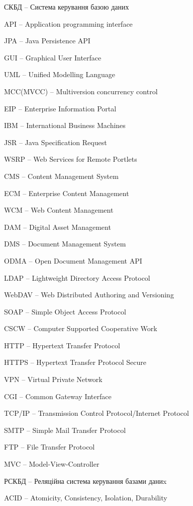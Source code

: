 \par СКБД -- Система керування базою даних
\par API -- Application programming interface
\par JPA -- Java Persistence API
\par GUI -- Graphical User Interface
\par UML -- Unified Modelling Language
\par MCC(MVCC) -- Multiversion concurrency control

\par EIP -- Enterprise Information Portal
\par IBM -- International Business Machines
\par JSR -- Java Specification Request
\par WSRP -- Web Services for Remote Portlets
\par CMS -- Content Management System 
\par ECM -- Enterprise Content Management
\par WCM -- Web Content Management 
\par DAM -- Digital Asset Management
\par DMS -- Document Management System

\par ODMA -- Open Document Management API
\par LDAP -- Lightweight Directory Access Protocol
\par WebDAV -- Web Distributed Authoring and Versioning
\par SOAP -- Simple Object Access Protocol
\par CSCW -- Computer Supported Cooperative Work

\par HTTP -- Hypertext Transfer Protocol
\par HTTPS -- Hypertext Transfer Protocol Secure
\par VPN -- Virtual Private Network
\par CGI -- Common Gateway Interface
\par TCP/IP -- Transmission Control Protocol/Internet Protocol
\par SMTP -- Simple Mail Transfer Protocol
\par FTP -- File Transfer Protocol

\par MVC -- Model-View-Controller
\par РСКБД -- Реляційна система керування базами даниx
\par ACID -- Atomicity, Consistency, Isolation, Durability


